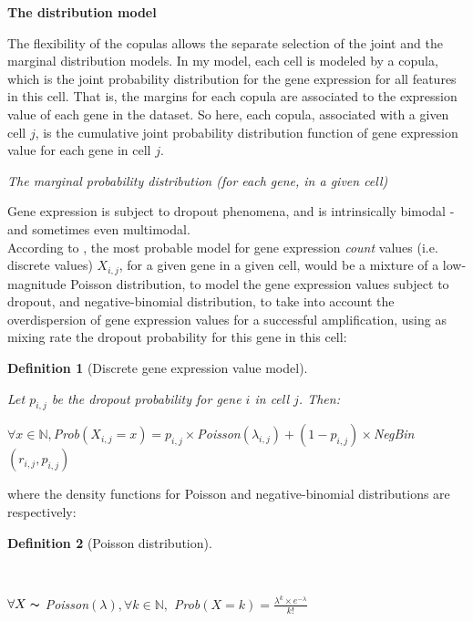 \documentclass{report}
\newtheorem{definition}{Definition}[section]
\begin{document}
{\bigskip
\noindent \textbf{The distribution model}
\bigskip

The flexibility of the copulas allows the separate selection of the joint and the marginal distribution models. In my model, each cell is modeled by a copula, which is the joint probability distribution for the gene expression for all features in this cell. That is, the margins for each copula are associated to the expression value of each gene in the dataset. So here, each copula, associated with a given cell $j$, is the cumulative joint probability distribution function of gene expression value for each gene in cell $j$.

\bigskip
\noindent \textit{The marginal probability distribution (for each gene, in a given cell)}
\bigskip

Gene expression is subject to dropout phenomena\cite{kharchenko2014bayesian}, and is intrinsically bimodal\cite{finak2015mast}\cite{bessarabova2010bimodal} -and sometimes even multimodal\cite{ochab2010bimodal}.\\

According to \cite{kharchenko2014bayesian}, the most probable model for gene expression \textit{count} values (i.e. discrete values) $X_{i,j}$, for a given gene in a given cell, would be a mixture of a low-magnitude Poisson distribution, to model the gene expression values subject to dropout, and negative-binomial distribution, to take into account the overdispersion of gene expression values for a successful amplification, using as mixing rate the dropout probability for this gene in this cell:

\begin{definition}[Discrete gene expression value model]\label{genexpressiondiscrete}{Let $p_{i,j}$ be the dropout probability for gene $i$ in cell $j$. Then:
\begin{center}$\forall x \in \mathbb{N}, $\textit{Prob}$(X_{i,j} = x) = p_{i,j} \times $\textit{Poisson}$(\lambda_{i,j}) + (1-p_{i,j}) \times $\textit{NegBin}$(r_{i,j}, p_{i,j})$\end{center}}\end{definition}

where the density functions for Poisson and negative-binomial distributions are respectively:

\begin{definition}[Poisson distribution]\label{poisson}{~\\\begin{center}$\forall X \thicksim$ \textit{Poisson}$(\lambda), \forall k \in \mathbb{N},$ \textit{Prob}$(X = k) = \frac{\lambda^k \times e^{-\lambda}}{k!}$\end{center}}\end{definition}

}
\end{document}
